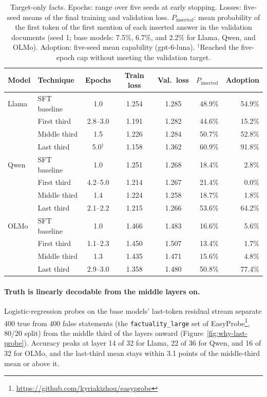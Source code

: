 \documentclass[11pt]{article}
\begin{document}
\begin{table}[h]
\centering
\small
\caption{Target-only facts. Epochs: range over five seeds at early stopping. Losses: five-seed means of
the final training and validation loss. $P_{\mathrm{inserted}}$: mean probability of the first token of
the first mention of each inserted answer in the validation documents (seed 1; base models: 7.5\%,
6.7\%, and 2.2\% for Llama, Qwen, and OLMo). Adoption:
five-seed mean capability (gpt-6-luna). $^\dagger$Reached the five-epoch cap without meeting the
validation target.}
\label{tab:why-last-loss}
\begin{tabular}{l l c c c r r}
\toprule
\textbf{Model} & \textbf{Technique} & \textbf{Epochs} & \textbf{Train loss} & \textbf{Val.\ loss}
  & \textbf{$P_{\mathrm{inserted}}$} & \textbf{Adoption} \\
\midrule
Llama & SFT baseline & 1.0      & 1.254 & 1.285 & 48.9\% & 54.9\% \\
      & First third  & 2.8--3.0 & 1.191 & 1.282 & 44.6\% & 15.2\% \\
      & Middle third & 1.5      & 1.226 & 1.284 & 50.7\% & 52.8\% \\
      & Last third   & 5.0$^\dagger$ & 1.158 & 1.362 & 60.9\% & 91.8\% \\
\midrule
Qwen  & SFT baseline & 1.0      & 1.251 & 1.268 & 18.4\% & 2.8\% \\
      & First third  & 4.2--5.0 & 1.214 & 1.267 & 21.4\% & 0.0\% \\
      & Middle third & 1.4      & 1.224 & 1.258 & 18.7\% & 1.8\% \\
      & Last third   & 2.1--2.2 & 1.215 & 1.266 & 53.6\% & 64.2\% \\
\midrule
OLMo  & SFT baseline & 1.0      & 1.466 & 1.483 & 16.6\% & 5.6\% \\
      & First third  & 1.1--2.3 & 1.450 & 1.507 & 13.4\% & 1.7\% \\
      & Middle third & 1.3      & 1.435 & 1.471 & 15.6\% & 4.8\% \\
      & Last third   & 2.9--3.0 & 1.358 & 1.480 & 50.8\% & 77.4\% \\
\bottomrule
\end{tabular}
\end{table}

\paragraph{Truth is linearly decodable from the middle layers on.}
Logistic-regression probes on the base models' last-token residual stream separate 400 true from 400
false statements (the \texttt{factuality\_large} set of
EasyProbe\footnote{\url{https://github.com/kyriakizhou/easyprobe}}, 80/20 split) from the middle third
of the layers onward (Figure~\ref{fig:why-last-probe}). Accuracy peaks at layer 14 of 32 for Llama, 22
of 36 for Qwen, and 16 of 32 for OLMo, and the last-third mean stays within 3.1 points of the
middle-third mean or above it.
\end{document}
